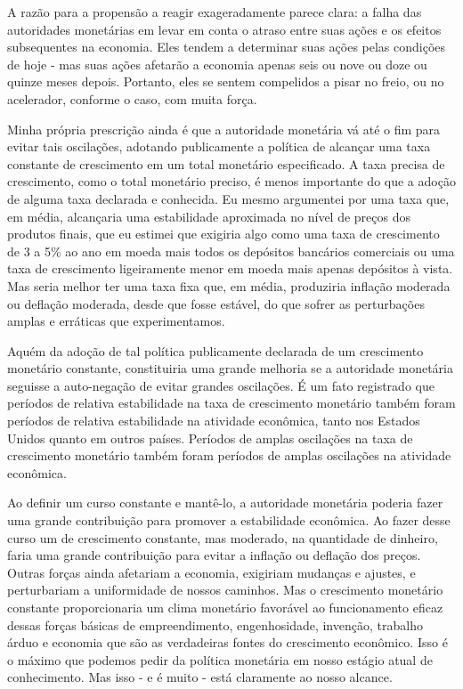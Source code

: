 \documentclass[12pt]{article}
\begin{document}
A razão para a propensão a reagir exageradamente parece clara: a falha das autoridades monetárias em levar em conta o atraso entre suas ações e os efeitos subsequentes na economia. Eles tendem a determinar suas ações pelas condições de hoje - mas suas ações afetarão a economia apenas seis ou nove ou doze ou quinze meses depois. Portanto, eles se sentem compelidos a pisar no freio, ou no acelerador, conforme o caso, com muita força.

Minha própria prescrição ainda é que a autoridade monetária vá até o fim para evitar tais oscilações, adotando publicamente a política de alcançar uma taxa constante de crescimento em um total monetário especificado. A taxa precisa de crescimento, como o total monetário preciso, é menos importante do que a adoção de alguma taxa declarada e conhecida. Eu mesmo argumentei por uma taxa que, em média, alcançaria uma estabilidade aproximada no nível de preços dos produtos finais, que eu estimei que exigiria algo como uma taxa de crescimento de 3 a 5\% ao ano em moeda mais todos os depósitos bancários comerciais ou uma taxa de crescimento ligeiramente menor em moeda mais apenas depósitos à vista. Mas seria melhor ter uma taxa fixa que, em média, produziria inflação moderada ou deflação moderada, desde que fosse estável, do que sofrer as perturbações amplas e erráticas que experimentamos.

Aquém da adoção de tal política publicamente declarada de um crescimento monetário constante, constituiria uma grande melhoria se a autoridade monetária seguisse a auto-negação de evitar grandes oscilações. É um fato registrado que períodos de relativa estabilidade na taxa de crescimento monetário também foram períodos de relativa estabilidade na atividade econômica, tanto nos Estados Unidos quanto em outros países. Períodos de amplas oscilações na taxa de crescimento monetário também foram períodos de amplas oscilações na atividade econômica.

Ao definir um curso constante e mantê-lo, a autoridade monetária poderia fazer uma grande contribuição para promover a estabilidade econômica. Ao fazer desse curso um de crescimento constante, mas moderado, na quantidade de dinheiro, faria uma grande contribuição para evitar a inflação ou deflação dos preços. Outras forças ainda afetariam a economia, exigiriam mudanças e ajustes, e perturbariam a uniformidade de nossos caminhos. Mas o crescimento monetário constante proporcionaria um clima monetário favorável ao funcionamento eficaz dessas forças básicas de empreendimento, engenhosidade, invenção, trabalho árduo e economia que são as verdadeiras fontes do crescimento econômico. Isso é o máximo que podemos pedir da política monetária em nosso estágio atual de conhecimento. Mas isso - e é muito - está claramente ao nosso alcance.
\end{document}
